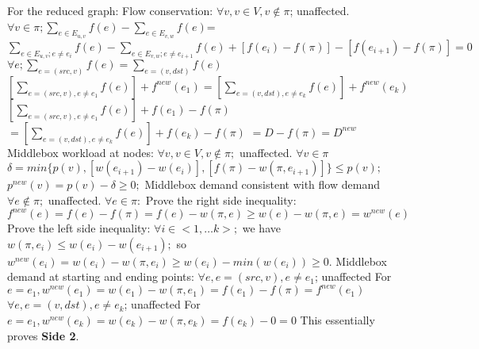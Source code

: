 \documentclass{sig-alternate}
\begin{document}
For the reduced graph:
\newline
Flow conservation:
\newline
$\forall v,v \in V, v\not\in \pi$; unaffected.
\newline
$\forall v \in \pi; \sum\limits_{e \in E_{u, v}}  f(e) - \sum\limits_{e \in E_{v, w} } f(e)$=
\newline$\sum\limits_{e \in E_{u, v} ; e\not= e_i}  f(e) - \sum\limits_{e \in E_{v, w}; e\not=e_{i+1} } f(e) +[f(e_i)-f(\pi) ] - [f(e_{i+1}) -f(\pi)] = 0 $
\newline
\newline
$ \forall e; \sum\limits_{e=(src, v)} f(e) = \sum\limits_{e=(v, dst)} f(e)$\newline
$[\sum\limits_{e=(src, v), e\not = e_1} f(e) ]+f^{new}(e_1)= [\sum\limits_{e=(v, dst), e\not = e_k} f(e) ]+ f^{new}(e_k)$\newline
$[\sum\limits_{e=(src, v), e\not = e_1} f(e) ]+f(e_1) -f(\pi)$\newline
$= [\sum\limits_{e=(v, dst), e\not = e_k} f(e) ]+ f(e_k)-f(\pi)$\newline
$=D-f(\pi) = D^{new} $
\newline
Middlebox workload at nodes:\newline
$\forall v ,v\in V, v \not\in \pi;$ unaffected.\newline
$\forall v \in \pi$\newline
$  \delta = min\{p(v), [w(e_{i+1}) - w(e_i)],[ f(\pi) -w(\pi,e_{i+1})]\}\leq p(v);$\newline
$ p^{new}(v)=p(v) -\delta  \geq 0;$\newline
Middlebox demand consistent with flow demand\newline
$\forall e \not \in \pi;$ unaffected. \newline
$\forall e \in \pi:$\newline
Prove the right side inequality: $f^{new}(e) = f(e)-f(\pi)= f(e)-w(\pi,e) \geq w(e)-w(\pi,e) = w^{new}(e)$ \newline
Prove the left side inequality: $\forall i \in <1, \dots k>;$ we have $ w(\pi, e_i) \leq w(e_i) -w(e_{i+1});$ so $w^{new}(e_i) = w(e_i)-w(\pi, e_i) \geq w(e_i)- min(w(e_i)) \geq 0$.\newline
Middlebox demand at starting and ending points:\newline
$\forall e, e =(src, v), e\not = e_1$; unaffected\newline
For $ e=e_1, w^{new}(e_1) = w(e_1)-w(\pi, e_1) = f(e_1)-f(\pi) =f^{new}(e_1)$\newline
$\forall e, e =(v, dst), e\not = e_k$; unaffected\newline
For $ e=e_1, w^{new}(e_k) = w(e_k)-w(\pi, e_k) = f(e_k)-0 =0$
\newline
This essentially proves \textbf{Side 2}.
\end{document}
